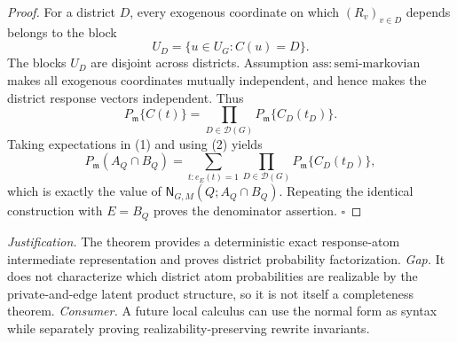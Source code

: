 \documentclass{article}
\begin{document}
\begin{proof}
For a district \(D\), every exogenous coordinate on which \((R_v)_{v\in D}\) depends belongs to the block
\[
 U_D=\{u\in U_G:C(u)=D\}.
\]
The blocks \(U_D\) are disjoint across districts.  Assumption \(\mathrm{ass:semi\text{-}markovian}\) makes all exogenous coordinates mutually independent, and hence makes the district response vectors independent.  Thus
\[
 P_{\mathfrak m}\{C(t)\}
 =\prod_{D\in\mathcal D(G)}P_{\mathfrak m}\{C_D(t_D)\}.
\tag{2}
\]
Taking expectations in (1) and using (2) yields
\[
 P_{\mathfrak m}(A_Q\cap B_Q)
 =\sum_{t:e_E(t)=1}
   \prod_{D\in\mathcal D(G)}P_{\mathfrak m}\{C_D(t_D)\},
\]
which is exactly the value of \(\mathsf N_{G,M}(Q;A_Q\cap B_Q)\).  Repeating the identical construction with \(E=B_Q\) proves the denominator assertion. \(\square\)
\end{proof}
\par\smallskip\noindent \textit{Justification.} The theorem provides a deterministic exact response-atom intermediate representation and proves district probability factorization. \textit{Gap.} It does not characterize which district atom probabilities are realizable by the private-and-edge latent product structure, so it is not itself a completeness theorem. \textit{Consumer.} A future local calculus can use the normal form as syntax while separately proving realizability-preserving rewrite invariants.
\end{document}
